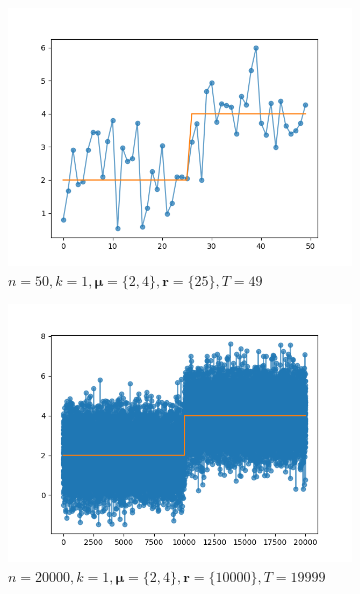 \begin{figure}[H]
    \centering
    \begin{subfigure}{.3\textwidth}
    	\centering
        \includegraphics[width=\linewidth]{../../plots/sequence_M2_N50_seed1_diffind2.png}
        \caption{$n=50, k=1, \bm{\mu} = \{2, 4\}, \bm{r} = \{25\}, T = 49$}
    \end{subfigure}
    \begin{subfigure}{.3\textwidth}
        \centering
    	\includegraphics[width=\linewidth]{../../plots/sequence_M2_N20000_seed1_diffind2.png}
    	\caption{$n=20000, k=1, \bm{\mu} = \{2, 4\}, \bm{r} = \{10000\}, T = 19999$}
	\end{subfigure}
	\begin{subfigure}{.3\textwidth}

\end{subfigure}
\end{figure}
